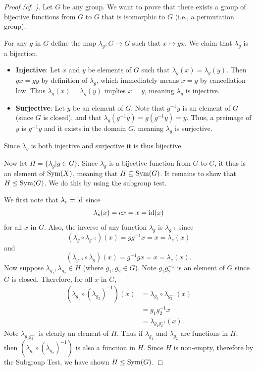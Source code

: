 \begin{proof}[Proof (cf. {\cite[Proof 2]{proofwiki_cayleys-theorem}})]
    Let $G$ be any group. We want to prove that there exists a group of bijective functions from $G$ to $G$ that is isomorphic to $G$ (i.e., a permutation group).

    For any $g$ in $G$ define the map $\lambda_g: G \to G$ such that $x \mapsto gx$. We claim that $\lambda_g$ is a bijection.
    \begin{itemize}
        \item \textbf{Injective}: Let $x$ and $y$ be elements of $G$ such that $\lambda_g(x) = \lambda_g(y)$. Then $gx = gy$ by definition of $\lambda_g$, which immediately means $x = y$ by cancellation law. Thus $\lambda_g(x) = \lambda_g(y)$ implies $x = y$, meaning $\lambda_g$ is injective.
        
        \item \textbf{Surjective}: Let $y$ be an element of $G$. Note that $g^{-1}y$ is an element of $G$ (since $G$ is closed), and that $\lambda_g(g^{-1}y) = g(g^{-1}y) = y$. Thus, a preimage of $y$ is $g^{-1}y$ and it exists in the domain $G$, meaning $\lambda_g$ is surjective.
    \end{itemize}
    Since $\lambda_g$ is both injective and surjective it is thus bijective.

    Now let $H = \{\lambda_g \vert g \in G\}$. Since $\lambda_g$ is a bijective function from $G$ to $G$, it thus is an element of $\mathrm{Sym}(X)$, meaning that $H \subseteq \mathrm{Sym}(G)$. It remains to show that $H \leq \mathrm{Sym}(G)$. We do this by using the subgroup test.

    We first note that $\lambda_e = \mathrm{id}$ since
    \[
        \lambda_e(x) = ex = x = \mathrm{id}(x)
    \]
    for all $x$ in $G$. Also, the inverse of any function $\lambda_g$ is $\lambda_{g^{-1}}$ since
    \[
        (\lambda_g \circ \lambda_{g^{-1}})(x) = gg^{-1}x = x = \lambda_e(x)
    \]
    and
    \[
        (\lambda_{g^{-1}} \circ \lambda_g)(x) = g^{-1}gx = x = \lambda_e(x).
    \]
    Now suppose $\lambda_{g_1}, \lambda_{g_2} \in H$ (where $g_1, g_2 \in G$). Note $g_1g_2^{-1}$ is an element of $G$ since $G$ is closed. Therefore, for all $x$ in $G$,
    \begin{align*}
        \left(\lambda_{g_1} \circ \left(\lambda_{g_2}\right)^{-1}\right)(x) &= \lambda_{g_1}\circ\lambda_{g_2^{-1}}(x)\\
        &= g_1g_2^{-1}x\\
        &= \lambda_{g_1g_2^{-1}}(x).
    \end{align*}
    Note $\lambda_{g_1g_2^{-1}}$ is clearly an element of $H$. Thus if $\lambda_{g_1}$ and $\lambda_{g_2}$ are functions in $H$, then $\left(\lambda_{g_1} \circ \left(\lambda_{g_2}\right)^{-1}\right)$ is also a function in $H$. Since $H$ is non-empty, therefore by the Subgroup Test, we have shown $H \leq \mathrm{Sym}(G)$.


\end{proof}
